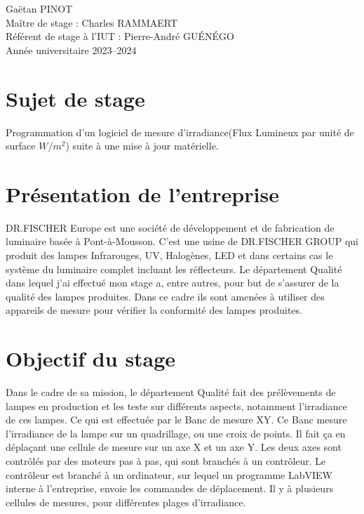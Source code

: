 \documentclass[12pt]{article}
\begin{document}
\vfill

{\Large
\noindent
Gaëtan PINOT\\
Maître de stage : Charles RAMMAERT\\
Référent de stage à l'IUT : Pierre-André GUÉNÉGO\\
Année universitaire 2023--2024
}


\thispagestyle{empty}
\newpage

\restoregeometry
\thispagestyle{empty}
\tableofcontents
\newpage


\section{Sujet de stage}

Programmation d'un logiciel de mesure d'irradiance(Flux Lumineux par unité de surface $W/m^2$) suite à une mise à jour matérielle.  

\section{Présentation de l'entreprise}

DR.FISCHER Europe est une société de développement et de fabrication de luminaire basée à Pont-à-Mousson. C'est une usine de DR.FISCHER GROUP qui produit des lampes Infrarouges, UV, Halogènes, LED et dans certains cas le système du luminaire complet incluant les réflecteurs.  
Le département Qualité dans lequel j'ai effectué mon stage a, entre autres, pour but de s'assurer de la qualité des lampes produites.  
Dans ce cadre ils sont amenées à utiliser des appareils de mesure pour vérifier la conformité des lampes produites.  

\section{Objectif du stage}


Dans le cadre de sa mission, le département Qualité fait des prélèvements de lampes en production et les teste sur différents aspects, notamment l'irradiance de ces lampes.
Ce qui est effectuée par le Banc de mesure XY.  
Ce Banc mesure l'irradiance de la lampe sur un quadrillage, ou une croix de points.
Il fait ça en déplaçant une cellule de mesure sur un axe X et un axe Y.
Les deux axes sont contrôlés par des moteurs pas à pas, qui sont branchés à un contrôleur.
Le contrôleur est branché à un ordinateur, sur lequel un programme LabVIEW interne à l'entreprise, envoie les commandes de déplacement.  
Il y à plusieurs cellules de mesures, pour différentes plages d'irradiance.  
\end{document}
